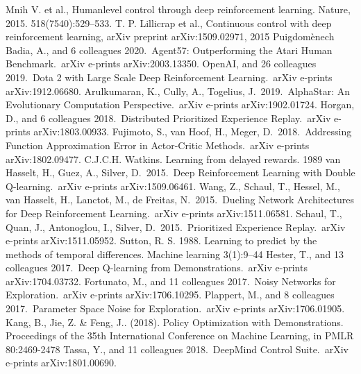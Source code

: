 \documentclass{mipt-thesis-bs}
\begin{document}
\begin{thebibliography}{99}
        Mnih V. et al., Humanlevel control through deep reinforcement learning. Nature, 2015.
518(7540):529–533.
         T. P. Lillicrap et al., Continuous control with deep reinforcement
learning, arXiv preprint arXiv:1509.02971, 2015
    Puigdom{\`e}nech Badia, A., and 6 colleagues 2020.\ Agent57: Outperforming the Atari Human Benchmark.\ arXiv e-prints arXiv:2003.13350.
     OpenAI, and 26 colleagues 2019.\ Dota 2 with Large Scale Deep Reinforcement Learning.\ arXiv e-prints arXiv:1912.06680.
     Arulkumaran, K., Cully, A., Togelius, J.\ 2019.\ AlphaStar: An Evolutionary Computation Perspective.\ arXiv e-prints arXiv:1902.01724.
     Horgan, D., and 6 colleagues 2018.\ Distributed Prioritized Experience Replay.\ arXiv e-prints arXiv:1803.00933.
     Fujimoto, S., van Hoof, H., Meger, D.\ 2018.\ Addressing Function Approximation Error in Actor-Critic Methods.\ arXiv e-prints arXiv:1802.09477.
     C.J.C.H. Watkins. Learning from delayed rewards. 1989
     van Hasselt, H., Guez, A., Silver, D.\ 2015.\ Deep Reinforcement Learning with Double Q-learning.\ arXiv e-prints arXiv:1509.06461.
      Wang, Z., Schaul, T., Hessel, M., van Hasselt, H., Lanctot, M., de Freitas, N.\ 2015.\ Dueling Network Architectures for Deep Reinforcement Learning.\ arXiv e-prints arXiv:1511.06581.
     Schaul, T., Quan, J., Antonoglou, I., Silver, D.\ 2015.\ Prioritized Experience Replay.\ arXiv e-prints arXiv:1511.05952.
     Sutton, R. S. 1988. Learning to predict by the methods of
temporal differences. Machine learning 3(1):9–44
     Hester, T., and 13 colleagues 2017.\ Deep Q-learning from Demonstrations.\ arXiv e-prints arXiv:1704.03732.
     Fortunato, M., and 11 colleagues 2017.\ Noisy Networks for Exploration.\ arXiv e-prints arXiv:1706.10295.
     Plappert, M., and 8 colleagues 2017.\ Parameter Space Noise for Exploration.\ arXiv e-prints arXiv:1706.01905.
     Kang, B., Jie, Z. & Feng, J.. (2018). Policy Optimization with Demonstrations. Proceedings of the 35th International Conference on Machine Learning, in PMLR 80:2469-2478
     Tassa, Y., and 11 colleagues 2018.\ DeepMind Control Suite.\ arXiv e-prints arXiv:1801.00690.

\end{thebibliography}
\end{document}
